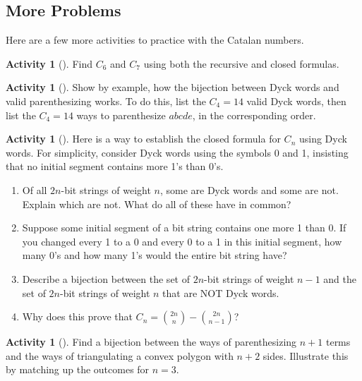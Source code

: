 \documentclass[10pt,]{book}
\theoremstyle{plain}
\theoremstyle{definition}
\theoremstyle{definition}
\theoremstyle{definition}
\newtheorem{activity}[project]{Activity}
\numberwithin{equation}{chapter}
\begin{document}
\subsection[{More Problems}]{More Problems}\label{subsec-catalanproblems}
\hypertarget{p-1039}{}%
Here are a few more activities to practice with the Catalan numbers.%
\begin{activity}[]\label{activity-177}
\hypertarget{p-1040}{}%
Find \(C_6\) and \(C_7\) using both the recursive and closed formulas.%
\end{activity}
\begin{activity}[]\label{activity-178}
\hypertarget{p-1041}{}%
Show by example, how the bijection between Dyck words and valid parenthesizing works.  To do this, list the \(C_4 = 14\) valid Dyck words, then list the \(C_4 = 14\) ways to parenthesize \(abcde\), in the corresponding order.%
\end{activity}
\begin{activity}[]\label{activity-179}
\hypertarget{p-1042}{}%
Here is a way to establish the closed formula for \(C_n\) using Dyck words.  For simplicity, consider Dyck words using the symbols 0 and 1, insisting that no initial segment contains more 1's than 0's.%
\begin{enumerate}[font=\bfseries,label=(\alph*),ref=\alph*]
\item\label{task-197} \hypertarget{p-1043}{}%
Of all \(2n\)-bit strings of weight \(n\), some are Dyck words and some are not.  Explain which are not.  What do all of these have in common?%
\item\label{task-198} \hypertarget{p-1044}{}%
Suppose some initial segment of a bit string contains one more 1 than 0.  If you changed every 1 to a 0 and every 0 to a 1 in this initial segment, how many 0's and how many 1's would the entire bit string have?%
\item\label{task-199} \hypertarget{p-1045}{}%
Describe a bijection between the set of \(2n\)-bit strings of weight \(n-1\) and the set of \(2n\)-bit strings of weight \(n\) that are NOT Dyck words.%
\item\label{task-200} \hypertarget{p-1046}{}%
Why does this prove that \(C_n = \binom{2n}{n} - \binom{2n}{n-1}\)?%
\end{enumerate}
\end{activity}
\begin{activity}[]\label{activity-180}
\hypertarget{p-1047}{}%
Find a bijection between the ways of parenthesizing \(n+1\) terms and the ways of triangulating a convex polygon with \(n+2\) sides.  Illustrate this by matching up the outcomes for \(n = 3\).%
\end{activity}
\end{document}
